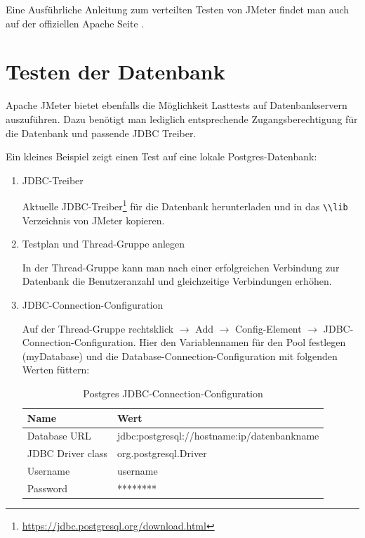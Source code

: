 \documentclass[a4paper,12pt]{article}
\newcommand{\codeInLine}[1]{%
\colorbox{graybackgroundColor}{\lstinline{#1}} %
}
\begin{document}
Eine Ausführliche Anleitung zum verteilten Testen von JMeter findet man auch auf der offiziellen Apache Seite \cite{online:apache_distributed}.

\section{Testen der Datenbank}
Apache JMeter bietet ebenfalls die Möglichkeit Lasttests auf Datenbankservern auszuführen. Dazu benötigt man lediglich entsprechende Zugangsberechtigung für die Datenbank und passende JDBC Treiber. 

Ein kleines Beispiel zeigt einen Test auf eine lokale Postgres-Datenbank:

\begin{enumerate}
	\item JDBC-Treiber
		
	Aktuelle JDBC-Treiber\footnote{\url{https://jdbc.postgresql.org/download.html}} für die Datenbank herunterladen und in das \codeInLine{\\lib} Verzeichnis von JMeter kopieren. 
	
	\item Testplan und Thread-Gruppe anlegen
	
	In der Thread-Gruppe kann man nach einer erfolgreichen Verbindung zur Datenbank die Benutzeranzahl und gleichzeitige Verbindungen erhöhen.
	
	\item JDBC-Connection-Configuration
	
	Auf der Thread-Gruppe rechtsklick $\rightarrow$ Add $\rightarrow$ Config-Element $\rightarrow$ JDBC-Connection-Configuration. Hier den Variablennamen für den Pool festlegen (myDatabase) und die Database-Connection-Configuration mit folgenden Werten füttern:
	
	\begin{table}[H]
	\centering
	\begin{tabular}{|l|l|}
		\hline
		\textbf{Name} & \textbf{Wert} \\
		\hline
		Database URL & jdbc:postgresql://hostname:ip/datenbankname \\
		JDBC Driver class & org.postgresql.Driver \\
		Username & username \\
		Password & ******** \\
		\hline
	\end{tabular}
	\caption[tab_jdbc_values]{Postgres JDBC-Connection-Configuration}
	\label{tab_jdbc_values}
\end{table}
	

\end{enumerate}
\end{document}
